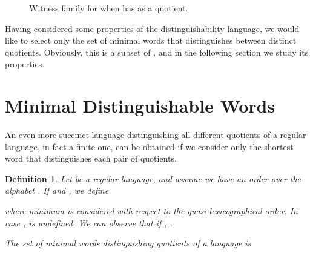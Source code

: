 \documentclass{article}
\newtheorem{definition}{Definition}
\begin{document}
\begin{figure}[h!]
\begin{center}
 \end{center}
\caption{Witness family for   when  has  as a quotient.} 
\label{fig:upsuffe} 
\end{figure}
Having considered some  properties of the distinguishability language,
we would like  to select only the set of minimal words that
distinguishes between distinct quotients. Obviously, 
this is a subset of , and in the following  section we study its properties.

\section{Minimal Distinguishable Words}
\label{sec:minDist}
An even more succinct language distinguishing all different quotients
of a regular language, in fact a finite one, can be obtained if we
consider only the shortest word that distinguishes each pair of
quotients.  

\begin{definition}
\label{def:distmin}  
    Let  be a regular language, and assume we have an order over 
the alphabet .
If  and , 
 we define 

where minimum is considered with respect to the quasi-lexicographical order.
In case   ,  is undefined.
We can observe that if , 
.


 The set of minimal words distinguishing quotients of a language  
is 

\end{definition}
 
\end{document}
